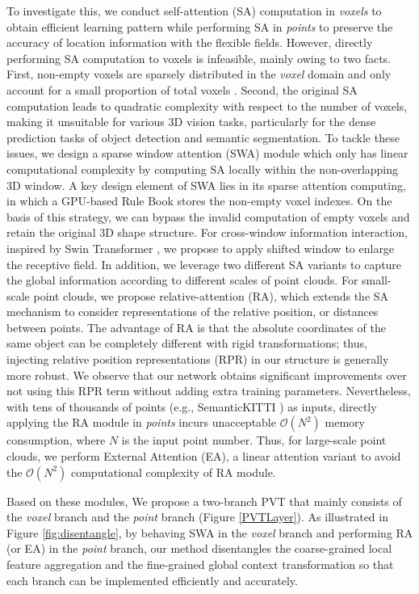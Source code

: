 \documentclass[10pt,twocolumn,letterpaper]{article}
\begin{document}
To investigate this, we conduct self-attention (SA) computation in \emph{voxels} to obtain efficient learning pattern while performing SA in \emph{points} to preserve the accuracy of location information with the flexible fields. 
However, directly performing SA computation to voxels is infeasible, mainly owing to two facts. First, non-empty voxels are sparsely distributed in the \emph{voxel} domain and only account for a small proportion of total voxels \cite{SECOND}. Second, the original SA computation leads to quadratic complexity with respect to the number of voxels, making it unsuitable for various 3D vision tasks, particularly for the dense prediction tasks of object detection and semantic segmentation.
To tackle these issues, we design a sparse window attention (SWA) module which only has linear computational complexity by computing SA locally within the non-overlapping 3D window.
A key design element of SWA lies in its sparse attention computing, in which
a GPU-based Rule Book stores the non-empty voxel indexes. On the basis of this strategy, we can bypass the invalid computation of empty voxels and retain the original 3D shape structure. For cross-window information interaction, inspired by Swin Transformer \cite{liu2021swin}, we propose to apply shifted window to enlarge the receptive field. In addition, we leverage two different SA variants to capture the global information according to different scales of point clouds. For small-scale point clouds, we propose relative-attention (RA), which extends the SA mechanism to consider representations of the relative position, or distances between points. The advantage of RA is that the absolute coordinates of the same object can be completely different with rigid transformations; thus, injecting relative position representations (RPR) in our structure is generally more robust.
We observe that our network obtains significant improvements over not using this RPR term without adding extra training parameters. Nevertheless, with tens of thousands of points (e.g., SemanticKITTI \cite{semanticKT}) as inputs, directly applying the RA module in \emph{points} incurs unacceptable $\mathcal{O}(N^2)$ memory consumption, where $N$ is the input point number. Thus, for large-scale point clouds, we perform External Attention (EA), a linear attention variant to avoid the $\mathcal{O}(N^2)$ computational complexity of RA module.

Based on these modules, We propose a two-branch PVT that mainly consists of the \emph{voxel} branch and the \emph{point} branch (Figure \ref{PVTLayer}). As illustrated in Figure \ref{fig:disentangle}, by behaving SWA in the \emph{voxel} branch and performing RA (or EA) in the \emph{point} branch, our method disentangles the coarse-grained local feature aggregation and the fine-grained global context transformation so that each branch can be implemented efficiently and accurately.
\end{document}
